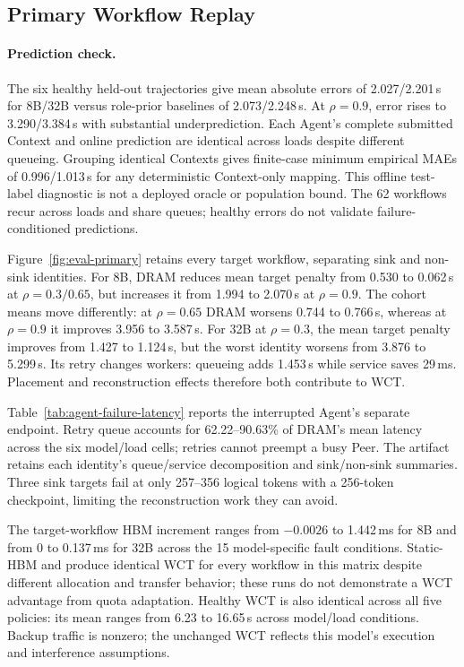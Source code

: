 \subsection{Primary Workflow Replay}
\label{sec:eval-primary}
\paragraph{Prediction check.}
The six healthy held-out trajectories give mean absolute errors of
2.027/2.201\,s for 8B/32B versus role-prior baselines of 2.073/2.248\,s.
At $\rho=0.9$, error rises to 3.290/3.384\,s with substantial underprediction.
Each Agent's complete submitted Context and online prediction are identical
across loads despite different queueing. Grouping identical Contexts gives
finite-case minimum empirical MAEs of 0.996/1.013\,s for any deterministic
Context-only mapping. This offline test-label diagnostic is not a deployed
oracle or population bound. The 62 workflows recur across loads and share
queues; healthy errors do not validate failure-conditioned predictions.

Figure~\ref{fig:eval-primary} retains every target workflow, separating sink
and non-sink identities. For 8B, DRAM reduces mean target penalty from
0.530 to 0.062\,s at $\rho=0.3/0.65$, but increases it from 1.994 to
2.070\,s at $\rho=0.9$. The cohort means move differently: at $\rho=0.65$
DRAM worsens 0.744 to 0.766\,s, whereas at $\rho=0.9$ it improves 3.956 to
3.587\,s. For 32B at $\rho=0.3$, the mean target penalty improves from
1.427 to 1.124\,s, but the worst identity worsens from 3.876 to 5.299\,s.
Its retry changes workers: queueing adds 1.453\,s while service saves 29\,ms.
Placement and reconstruction effects therefore both contribute to WCT.

Table~\ref{tab:agent-failure-latency} reports the interrupted Agent's separate
endpoint. Retry queue accounts for 62.22--90.63\% of DRAM's mean latency
across the six model/load cells; retries cannot preempt a busy Peer.
The artifact retains
each identity's queue/service decomposition and sink/non-sink summaries.
Three sink targets fail at only 257--356 logical tokens with a 256-token
checkpoint, limiting the reconstruction work they can avoid.

The target-workflow HBM increment ranges from $-0.0026$ to 1.442\,ms for 8B
and from 0 to 0.137\,ms for 32B across the 15 model-specific fault conditions.
Static-HBM and \system produce identical WCT for every workflow in this
matrix despite different allocation and transfer behavior; these runs do not
demonstrate a WCT advantage from quota adaptation. Healthy WCT is also
identical across all five policies: its mean ranges from 6.23 to 16.65\,s
across model/load conditions. Backup traffic is nonzero; the unchanged WCT
reflects this model's execution and interference assumptions.

